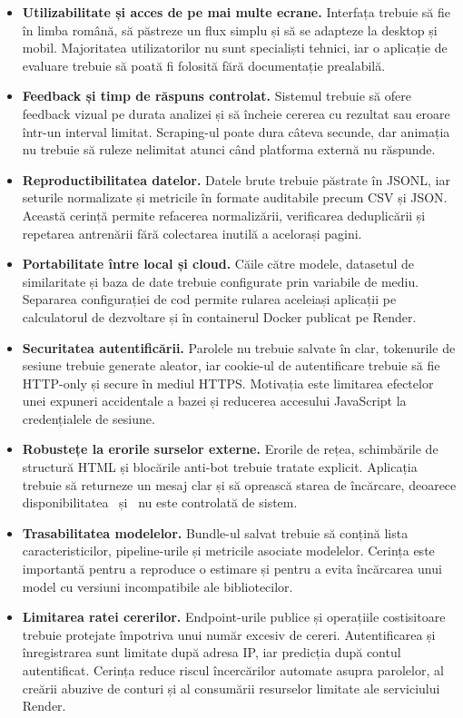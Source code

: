 \begin{itemize}
    \item \textbf{Utilizabilitate și acces de pe mai multe ecrane.} Interfața trebuie să fie în limba română, să păstreze un flux simplu și să se adapteze la desktop și mobil. Majoritatea utilizatorilor nu sunt specialiști tehnici, iar o aplicație de evaluare trebuie să poată fi folosită fără documentație prealabilă.
    \item \textbf{Feedback și timp de răspuns controlat.} Sistemul trebuie să ofere feedback vizual pe durata analizei și să încheie cererea cu rezultat sau eroare într-un interval limitat. Scraping-ul poate dura câteva secunde, dar animația nu trebuie să ruleze nelimitat atunci când platforma externă nu răspunde.
    \item \textbf{Reproductibilitatea datelor.} Datele brute trebuie păstrate în JSONL, iar seturile normalizate și metricile în formate auditabile precum CSV și JSON. Această cerință permite refacerea normalizării, verificarea deduplicării și repetarea antrenării fără colectarea inutilă a acelorași pagini.
    \item \textbf{Portabilitate între local și cloud.} Căile către modele, datasetul de similaritate și baza de date trebuie configurate prin variabile de mediu. Separarea configurației de cod permite rularea aceleiași aplicații pe calculatorul de dezvoltare și în containerul Docker publicat pe Render.
    \item \textbf{Securitatea autentificării.} Parolele nu trebuie salvate în clar, tokenurile de sesiune trebuie generate aleator, iar cookie-ul de autentificare trebuie să fie HTTP-only și secure în mediul HTTPS. Motivația este limitarea efectelor unei expuneri accidentale a bazei și reducerea accesului JavaScript la credențialele de sesiune.
    \item \textbf{Robustețe la erorile surselor externe.} Erorile de rețea, schimbările de structură HTML și blocările anti-bot trebuie tratate explicit. Aplicația trebuie să returneze un mesaj clar și să oprească starea de încărcare, deoarece disponibilitatea \autovit\ și \mobilede\ nu este controlată de sistem.
    \item \textbf{Trasabilitatea modelelor.} Bundle-ul salvat trebuie să conțină lista caracteristicilor, pipeline-urile și metricile asociate modelelor. Cerința este importantă pentru a reproduce o estimare și pentru a evita încărcarea unui model cu versiuni incompatibile ale bibliotecilor.
    \item \textbf{Limitarea ratei cererilor.} Endpoint-urile publice și operațiile costisitoare trebuie protejate împotriva unui număr excesiv de cereri. Autentificarea și înregistrarea sunt limitate după adresa IP, iar predicția după contul autentificat. Cerința reduce riscul încercărilor automate asupra parolelor, al creării abuzive de conturi și al consumării resurselor limitate ale serviciului Render.
\end{itemize}

